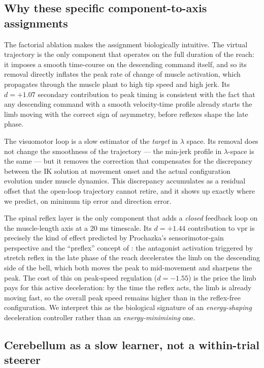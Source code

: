\documentclass[sn-basic]{sn-jnl}
\begin{document}
\subsection{Why these specific component-to-axis
assignments}

The factorial ablation makes the assignment biologically intuitive. The
virtual trajectory is the only component that operates on the full
duration of the reach: it imposes a smooth time-course on the descending
command itself, and so its removal directly inflates the peak rate of
change of muscle activation, which propagates through the muscle plant
to high tip speed and high jerk. Its \(d = +1.07\) secondary
contribution to peak timing is consistent with the fact that any
descending command with a smooth velocity-time profile already starts
the limb moving with the correct sign of asymmetry, before reflexes
shape the late phase.

The visuomotor loop is a slow estimator of the \emph{target} in $\lambda$ space.
Its removal does not change the smoothness of the trajectory --- the
min-jerk profile in $\lambda$-space is the same --- but it removes the
correction that compensates for the discrepancy between the IK solution
at movement onset and the actual configuration evolution under muscle
dynamics. This discrepancy accumulates as a residual offset that the
open-loop trajectory cannot retire, and it shows up exactly where we
predict, on minimum tip error and direction error.

The spinal reflex layer is the only component that adds a \emph{closed}
feedback loop on the muscle-length axis at a 20 ms timescale. Its
\(d = +1.44\) contribution to vpr is precisely the kind of effect
predicted by Prochazka's \citeyearpar{prochazka1989} sensorimotor-gain perspective and the
``preflex'' concept of \citet{loeb1984}: the antagonist activation triggered
by stretch reflex in the late phase of the reach decelerates the limb on
the descending side of the bell, which both moves the peak to
mid-movement and sharpens the peak. The cost of this on peak-speed
regulation (\(d = -1.55\)) is the price the limb pays for this active
deceleration: by the time the reflex acts, the limb is already moving
fast, so the overall peak speed remains higher than in the reflex-free
configuration. We interpret this as the biological signature of an
\emph{energy-shaping} deceleration controller rather than an
\emph{energy-minimising} one.

\subsection{Cerebellum as a slow learner, not a within-trial
steerer}
\end{document}
